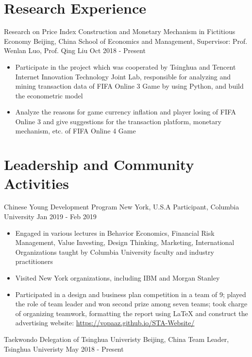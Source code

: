 \documentclass{resumeEN}
\begin{document}
    \section{Research Experience}

    \Experience
    {Research on Price Index Construction and Monetary Mechanism in Fictitious Economy}
    {Beijing, China}
    {School of Economics and Management, Supervisor: Prof. Wenlan Luo, Prof. Qing Liu}
    {Oct 2018 - Present}

    \begin{itemize}
        \item Participate in the project which was cooperated by Tsinghua and Tencent Internet Innovation Technology Joint Lab, responsible for analyzing and mining transaction data of FIFA Online 3 Game by using Python, and build the econometric model
        \item Analyze the reasons for game currency inflation and player losing of FIFA Online 3 and give suggestions for the transaction platform, monetary mechanism, etc. of FIFA Online 4 Game
    \end{itemize}


    \section{Leadership and Community Activities}

    \Experience
    {Chinese Young Development Program}
    {New York, U.S.A}
    {Participant, Columbia University}
    {Jan 2019 - Feb 2019}

    \begin{itemize}
        \item Engaged in various lectures in Behavior Economics, Financial Risk Management, Value Investing, Design Thinking, Marketing, International Organizations taught by Columbia University faculty and industry practitioners
        \item Visited New York organizations, including IBM and Morgan Stanley
        \item Participated in a design and business plan competition in a team of 9; played the role of team leader and won second prize among seven teams; took charge of organizing teamwork, formatting the report using {\LaTeX} and construct the advertising website: \href{https://vopaaz.github.io/STA-Website/}{https://vopaaz.github.io/STA-Website/}
    \end{itemize}

    \Experience
    {Taekwondo Delegation of Tsinghua Univeristy}
    {Beijing, China}
    {Team Leader, Tsinghua Univeristy}
    {May 2018 - Present}
\end{document}
